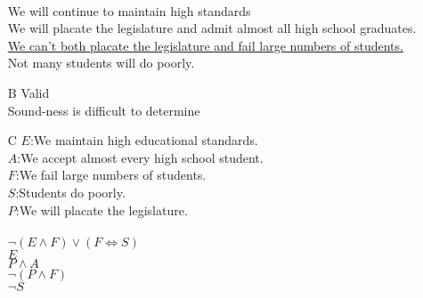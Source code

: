 \documentclass{article}
\begin{document}
\begin{enumerate}
		\\We will continue to maintain high standards
		\\We will placate the legislature and admit almost all high school graduates.
		\\\underline{We can't both placate the legislature and fail large numbers of students.}
		\\Not many students will do poorly.
	\item[B]
		Valid
		\\Sound-ness is difficult to determine
	\item[C]
		$E$:We maintain high educational standards.\\
		$A$:We accept almost every high school student.\\
		$F$:We fail large numbers of students.\\
		$S$:Students do poorly.\\
		$P$:We will placate the legislature.\\
		\\
		$\lnot(E \land F)\lor(F \iff S)$\\
		$E$\\
		$P \land A$\\
		\underline{$\lnot (P \land F)$}\\
		$\lnot S$
\end{enumerate}
\end{document}
